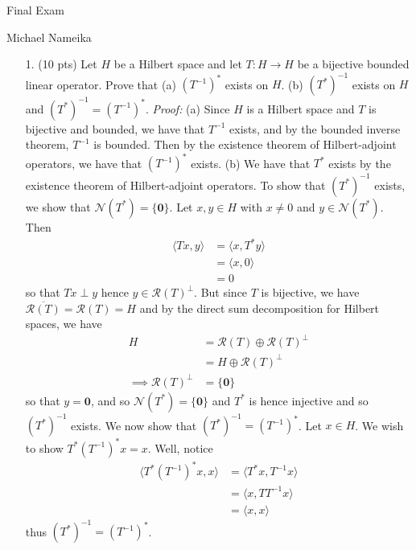 \documentclass{article}
\begin{document}
\begin{center}
    {\Huge Final Exam}
    \vspace{0.5cm}

    {\Large Michael Nameika}
\end{center}

\begin{itemize}
    \item[1.] (10 pts) Let $H$ be a Hilbert space and let $T: H \to H$ be a bijective bounded linear operator. Prove that
    \newline
    (a) $(T^{-1})^*$ exists on $H$.
    \newline
    (b) $(T^*)^{-1}$ exists on $H$ and $(T^*)^{-1} = (T^{-1})^*$.
    \newline\newline
    \textit{Proof:} (a) Since $H$ is a Hilbert space and $T$ is bijective and bounded, we have that $T^{-1}$ exists, and by the bounded inverse theorem, $T^{-1}$ is bounded. Then by the existence theorem of Hilbert-adjoint operators, we have that $(T^{-1})^*$ exists. 
    \newline\newline
    (b) We have that $T^*$ exists by the existence theorem of Hilbert-adjoint operators. To show that $(T^*)^{-1}$ exists, we show that $\mathcal{N}(T^*) = \{\mathbf{0}\}$. Let $x, y\in H$ with $x \neq 0$ and $y \in \mathcal{N}(T^*)$. Then 
    \begin{align*}
        \langle Tx, y\rangle &= \langle x, T^* y\rangle\\
        &= \langle x, 0\rangle\\
        &= 0
    \end{align*}
    so that $Tx \perp y$ hence $y \in \mathcal{R}(T)^{\perp}$. But since $T$ is bijective, we have $\overline{\mathcal{R}(T)} = \mathcal{R}(T) = H$ and by the direct sum decomposition for Hilbert spaces, we have
    \begin{align*}
        H &= \mathcal{R}(T) \oplus \mathcal{R}(T)^{\perp}\\
        &= H \oplus \mathcal{R}(T)^{\perp}\\
        \implies \mathcal{R}(T)^{\perp} &= \{\mathbf{0}\}
    \end{align*}
    so that $y = \mathbf{0}$, and so $\mathcal{N}(T^*) = \{\mathbf{0}\}$ and $T^*$ is hence injective and so $(T^*)^{-1}$ exists. We now show that $(T^*)^{-1} = (T^{-1})^*$. Let $x \in H$. We wish to show $T^*(T^{-1})^*x = x$. Well, notice
    \begin{align*}
        \langle T^*(T^{-1})^*x, x\rangle &= \langle T^*x, T^{-1}x\rangle\\
        &= \langle x, TT^{-1}x\rangle\\
        &= \langle x, x\rangle
    \end{align*}
    thus $(T^*)^{-1} = (T^{-1})^*$.



\end{itemize}
\end{document}
